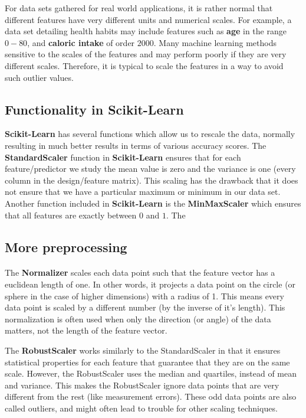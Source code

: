 \documentclass[%
oneside,                 %
final,                   %
10pt]{article}
\begin{document}
For data sets gathered for real world applications, it is rather normal that
different features have very different units and
numerical scales. For example, a data set detailing health habits may include
features such as \textbf{age} in the range $0-80$, and \textbf{caloric intake} of order $2000$.
Many machine learning methods sensitive to the scales of the features and may perform poorly if they
are very different scales. Therefore, it is typical to scale
the features in a way to avoid such outlier values.



\subsection*{Functionality in Scikit-Learn}

\textbf{Scikit-Learn} has several functions which allow us to rescale the
data, normally resulting in much better results in terms of various
accuracy scores.  The \textbf{StandardScaler} function in \textbf{Scikit-Learn}
ensures that for each feature/predictor we study the mean value is
zero and the variance is one (every column in the design/feature
matrix).  This scaling has the drawback that it does not ensure that
we have a particular maximum or minimum in our data set. Another
function included in \textbf{Scikit-Learn} is the \textbf{MinMaxScaler} which
ensures that all features are exactly between $0$ and $1$. The

\subsection*{More preprocessing}


\paragraph{}
The \textbf{Normalizer} scales each data
point such that the feature vector has a euclidean length of one. In other words, it
projects a data point on the circle (or sphere in the case of higher dimensions) with a
radius of 1. This means every data point is scaled by a different number (by the
inverse of it’s length).
This normalization is often used when only the direction (or angle) of the data matters,
not the length of the feature vector.

The \textbf{RobustScaler} works similarly to the StandardScaler in that it
ensures statistical properties for each feature that guarantee that
they are on the same scale. However, the RobustScaler uses the median
and quartiles, instead of mean and variance. This makes the
RobustScaler ignore data points that are very different from the rest
(like measurement errors). These odd data points are also called
outliers, and might often lead to trouble for other scaling
techniques.
\end{document}
